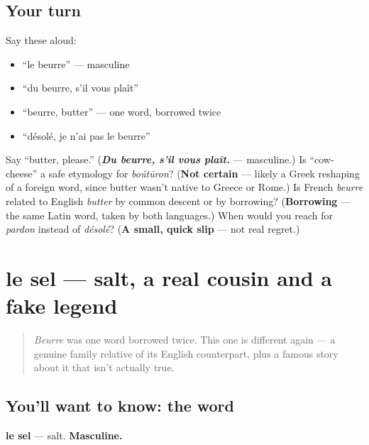 \subsection*{Your turn}
Say these aloud:

\begin{itemize}
\raggedright
  \item \textquotedblleft{}le beurre\textquotedblright{} — masculine
  \item \textquotedblleft{}du beurre, s'il vous plaît\textquotedblright{}
  \item \textquotedblleft{}beurre, butter\textquotedblright{} — one word, borrowed twice
  \item \textquotedblleft{}désolé, je n'ai pas le beurre\textquotedblright{}
\end{itemize}

\begin{tcolorbox}[breakable,colback=teal!4,colframe=teal!35!black,title={Before you move on}]
Say \textquotedblleft{}butter, please.\textquotedblright{} (\emph{\textbf{Du beurre, s'il vous plaît.}} — masculine.) Is \textquotedblleft{}cow-cheese\textquotedblright{} a safe etymology for \emph{boútūron}? (\textbf{Not certain} — likely a Greek reshaping of a foreign word, since butter wasn't native to Greece or Rome.) Is French \emph{beurre} related to English \emph{butter} by common descent or by borrowing? (\textbf{Borrowing} — the same Latin word, taken by both languages.) When would you reach for \emph{pardon} instead of \emph{désolé}? (\textbf{A small, quick slip} — not real regret.)
\end{tcolorbox}
\section[le sel]{le sel — salt, a real cousin and a fake legend}

\label{lesson:FR-C30-sel}



\begin{quote}
\emph{Beurre} was one word borrowed twice. This one is different again — a genuine family relative of its English counterpart, plus a famous story about it that isn't actually true.
\end{quote}

\subsection*{You'll want to know: the word}
\textbf{le sel} — salt. \textbf{Masculine.}

